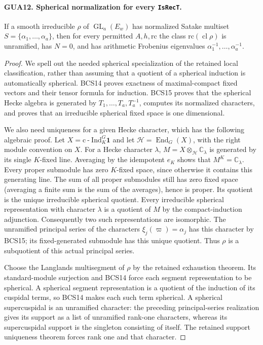 \documentclass[11pt,a4paper]{article}
\numberwithin{equation}{section}
\theoremstyle{remark}\newtheorem{remark}[theorem]{Remark}
\begin{document}
\paragraph{GUA12. Spherical normalization for every \texttt{Is\allowbreak Rec\allowbreak T}.}
\label{claim:GUA12}
If a smooth irreducible $\rho$ of $\operatorname{GL}_a(E_w)$
has normalized Satake multiset $S=\{\alpha_1,\ldots,\alpha_a\}$,
then for every permitted $A,h,\mathrm{rc}$ the class
$\mathrm{rc}(\operatorname{cl}\rho)$ is unramified,
has $N=0$, and has arithmetic Frobenius eigenvalues
$\alpha_1^{-1},\ldots,\alpha_a^{-1}$.
\begin{proof}
We spell out the needed spherical specialization of the
retained local classification, rather than assuming that
a quotient of a spherical induction is automatically
spherical.  BCS14 proves exactness of maximal-compact
fixed vectors and their tensor formula for induction.
BCS15 proves that the spherical Hecke algebra is generated
by $T_1,\ldots,T_a,T_a^{-1}$, computes its normalized
characters, and proves that an irreducible spherical
fixed space is one dimensional.

We also need uniqueness for a given Hecke character,
which has the following algebraic proof.  Let
$X=\mathrm{c\!\operatorname{-}Ind}_K^G\mathbf1$ and let
$\mathcal H=\operatorname{End}_G(X)$, with the right
module convention on $X$.  For a Hecke character $\lambda$,
$M=X\otimes_{\mathcal H}\mathbb C_\lambda$ is generated
by its single $K$-fixed line.  Averaging by the idempotent
$e_K$ shows that $M^K=\mathbb C_\lambda$.  Every proper
submodule has zero $K$-fixed space, since otherwise it
contains this generating line.  The sum of all proper
submodules still has zero fixed space (averaging a
finite sum is the sum of the averages), hence is proper.
Its quotient is the unique irreducible spherical quotient.
Every irreducible spherical representation with character
$\lambda$ is a quotient of $M$ by the compact-induction
adjunction.  Consequently two such representations are
isomorphic.  The unramified principal series of the
characters $\xi_j(\varpi)=\alpha_j$ has this character
by BCS15; its fixed-generated submodule has this unique
quotient.  Thus $\rho$ is a subquotient of this actual
principal series.

Choose the Langlands multisegment of $\rho$ by the
retained exhaustion theorem.  Its standard-module
surjection and BCS14 force each segment representation
to be spherical.  A spherical segment representation is
a quotient of the induction of its cuspidal terms, so
BCS14 makes each such term spherical.  A spherical
supercuspidal is an unramified character: the preceding
principal-series realization gives its support as a
list of unramified rank-one characters, whereas its
supercuspidal support is the singleton consisting of
itself.  The retained support uniqueness theorem forces
rank one and that character.


\end{proof}
\end{document}
